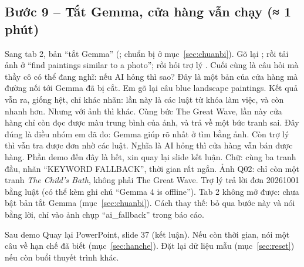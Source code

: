 \subsection{Bước 9 -- Tắt Gemma, cửa hàng vẫn chạy \normalfont\small(≈ 1 phút)}
Sang tab 2, bản ``tắt Gemma'' (; chuẩn bị ở mục~\ref{sec:chuanbi}). Gõ lại ; rồi tải ảnh  ở ``find paintings similar to a photo''; rồi hỏi trợ lý .
Cuối cùng là câu hỏi mà thầy cô có thể đang nghĩ: nếu AI hỏng thì sao?  Đây là một bản của cửa hàng mà đường nối tới Gemma đã bị cắt. Em gõ lại câu blue landscape paintings.  Kết quả vẫn ra, giống hệt, chỉ khác nhãn: lần này là các luật từ khóa làm việc, và còn nhanh hơn. Nhưng với ảnh thì khác.  Cùng bức The Great Wave, lần này cửa hàng chỉ còn đọc được màu trung bình của ảnh, và trả về một bức tranh sai. Đây đúng là điều nhóm em đã đo: Gemma giúp rõ nhất ở tìm bằng ảnh.  Còn trợ lý thì vẫn tra được đơn nhờ các luật. Nghĩa là AI hỏng thì cửa hàng vẫn bán được hàng. Phần demo đến đây là hết, xin quay lại slide kết luận.
Chữ: cùng ba tranh đầu, nhãn ``KEYWORD FALLBACK'', thời gian rất ngắn. Ảnh Q02: chỉ còn một tranh \emph{The Child's Bath}, không phải The Great Wave. Trợ lý trả lời đơn 20261001 bằng luật (có thể kèm ghi chú ``Gemma 4 is offline'').
Tab 2 không mở được: chưa bật bản tắt Gemma (mục~\ref{sec:chuanbi}). Cách thay thế: bỏ qua bước này và nói bằng lời, chỉ vào ảnh chụp ``ai\_fallback'' trong báo cáo.

\begin{note}[good]{Sau demo}
Quay lại PowerPoint, slide 37 (kết luận). Nếu còn thời gian, nói một câu về hạn chế đã biết (mục~\ref{sec:hanche}). Đặt lại dữ liệu mẫu (mục~\ref{sec:reset}) nếu còn buổi thuyết trình khác.
\end{note}
